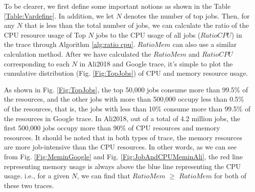 \documentclass[conference]{IEEEtran}
\begin{document}
\begin{figure*}[htbp]
\centering     %
{}
\caption{Top jobs occupying most CPU and memory}
\label{Fig:TopJobs}
\end{figure*}
\begin{figure*}[htbp]
\centering     %
{}
\caption{Minutely job submission rates for a given day. }
\label{Fig:submitedRatesGooAli}
\end{figure*}
To be clearer, we first define some important notions as shown in the Table \ref{Table:Vardefine}. In addition, we let $N$ denotes the number of top jobs. Then, for any $N$ that is less than the total number of jobs, we can calculate the ratio of the CPU resource usage of Top $N$ jobs to the CPU usage of all jobs ($RatioCPU$) in the trace through Algorithm \ref{alg:ratio cpu}. $RatioMem$ can also use a similar calculation method. After we have calculated the $RatioMem$ and $RatioCPU$ corresponding to each $N$ in Ali2018 and Google trace, it's simple to plot the cumulative distribution (Fig. \ref{Fig:TopJobs}) of CPU and memory resource usage. 

As shown in Fig. \ref{Fig:TopJobs}, the top 50,000 jobs consume more than 99.5\% of the resources, and the other jobs with more than 500,000 occupy less than 0.5\% of the resources, that is, the jobs with less than 10\% consume more than 99.5\% of the resources in Google trace. In Ali2018, out of a total of 4.2 million jobs, the first 500,000 jobs occupy more than 90\% of CPU resources and memory resources.
It should be noted that in both types of trace, the memory resources are more job-intensive than the CPU resources. In other words, as we can see from Fig. \ref{Fig:MeminGoogle} and Fig. \ref{Fig:JobAndCPUMeminAli}, the red line representing memory usage is always above the blue line representing the CPU usage. i.e., for a given $N$, we can find that $RatioMem$ $\ge$ $RatioMem$ for both of these two traces.
\end{document}
